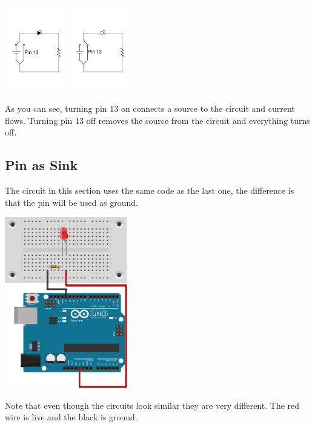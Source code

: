 \begin{center}
\includegraphics[width=0.2\textwidth]{./Graphics/ledOn13.pdf}
\includegraphics[width=0.2\textwidth]{./Graphics/ledOff13.pdf}
\end{center}

As you can see, 
turning pin 13 on connects a source to the circuit 
and current flows.
Turning pin 13 off removes the source from the circuit 
and everything turns off.

\subsection{Pin as Sink}

The circuit in this section uses the same code as the last one,
the difference is that the pin will be used as ground.

\begin{center}
    \includegraphics[width=0.4\textwidth]{./Graphics/PinSink}
\end{center}
Note that even though the circuits look similar they are very different.
The red wire is live and the black is ground.

